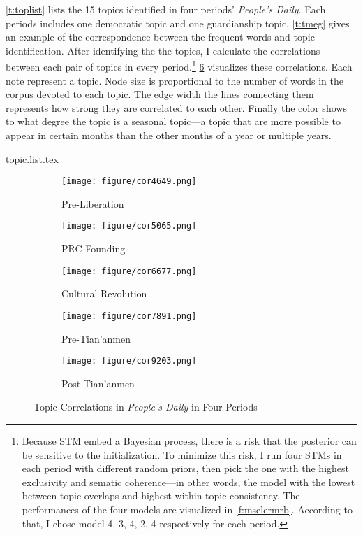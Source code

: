 \documentclass[abstracton,UTF8]{ctexart}
\begin{document}
\cref{t:toplist} lists the 15 topics identified in four periods' \textit{People's Daily}. Each periods includes one democratic topic and one guardianship topic. \cref{t:tmeg} gives an example of the correspondence between the frequent words and topic identification. After identifying the the topics, I calculate the correlations between each pair of topics in every period.\footnote{Because STM embed a Bayesian process, there is a risk that the posterior can be sensitive to the initialization. To minimize this risk, I run four STMs in each period with different random priors, then pick the one with the highest exclusivity and sematic coherence---in other words, the model with the lowest between-topic overlaps and highest within-topic consistency. The performances of the four models are visualized in \cref{f:mselermrb}. According to that, I chose model 4, 3, 4, 2, 4 respectively for each period.} \cref{f:corrmrb} visualizes these correlations. Each note represent a topic. Node size is proportional to the number of words in the corpus devoted to each topic. The edge width the lines connecting them represents how strong they are correlated to each other. Finally the color shows to what degree the topic is a seasonal topic---a topic that are more possible to appear in certain months than the other months of a year or multiple years.

{topic.list.tex}

\begin{figure}[htbp]
	\begin{subfigure}{0.45\textwidth}
		\texttt{[image: figure/cor4649.png]}
		\caption{Pre-Liberation}
		\label{f:cor46}
	\end{subfigure}
	\begin{subfigure}{0.45\textwidth}
		\texttt{[image: figure/cor5065.png]}
		\caption{PRC Founding}
		\label{f:cor50}
	\end{subfigure}
	\begin{subfigure}{0.45\textwidth}
		\texttt{[image: figure/cor6677.png]}
		\caption{Cultural Revolution}
		\label{f:cor66}
	\end{subfigure}
	\begin{subfigure}{0.45\textwidth}
		\texttt{[image: figure/cor7891.png]}
		\caption{Pre-Tian'anmen}
		\label{f:cor78}
	\end{subfigure}
	\begin{subfigure}{0.45\textwidth}
		\texttt{[image: figure/cor9203.png]}
		\caption{Post-Tian'anmen}
		\label{f:cor92}
	\end{subfigure}
	\caption{Topic Correlations in \textit{People's Daily} in Four Periods}
	\label{f:corrmrb}
\end{figure}
\end{document}
